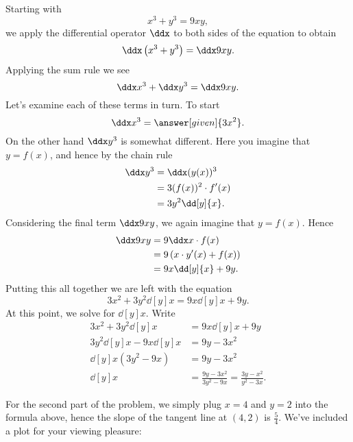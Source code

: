 \documentclass{ximera}
\begin{document}
\begin{example}
\begin{explanation}
Starting with 
\[
x^3+y^3 = 9xy,
\]
we apply the differential operator $\ddx$ to both sides of the
equation to obtain
\[
\ddx \left(x^3+y^3\right) = \ddx 9xy.
\]
Applying the sum rule we see
\[
\ddx x^3+\ddx y^3 = \ddx 9xy.
\]
Let's examine each of these terms in turn. To start
\[
\ddx x^3 = \answer[given]{3x^2}.
\]
On the other hand $\ddx y^3$ is somewhat different. Here you imagine that $y = f(x)$, and hence by the chain rule
\begin{align*}
\ddx y^3 &= \ddx (y(x))^3 \\ 
&= 3(f(x))^2 \cdot f'(x) \\
&= 3y^2\dd[y]{x}.
\end{align*}
Considering the final term $\ddx 9xy$, we again imagine that $y=f(x)$. Hence 
\begin{align*}
\ddx 9xy &= 9\ddx x\cdot f(x) \\
&= 9 \left(x\cdot y'(x) + f(x)\right)\\
&= 9x \dd[y]{x} + 9y.
\end{align*}
Putting this all together we are left with the equation
\[
3x^2 + 3y^2\dd[y]{x} =9x \dd[y]{x} + 9y.
\]
At this point, we solve for $\dd[y]{x}$. Write
\begin{align*}
3x^2 + 3y^2\dd[y]{x} &= 9x \dd[y]{x} + 9y\\
3y^2\dd[y]{x} -  9x \dd[y]{x} &= 9y - 3x^2\\
\dd[y]{x}\left(3y^2-9x\right)&= 9y - 3x^2\\
\dd[y]{x} &=\frac{9y - 3x^2}{3y^2-9x} = \frac{3y - x^2}{y^2-3x}.
\end{align*}

For the second part of the problem, we simply plug $x=4$ and $y=2$
into the formula above, hence the slope of the tangent line at $(4,2)$
is $\frac{5}{4}$. We've included a plot for your viewing pleasure:
\begin{image}
\end{image}
\end{explanation}
\end{example}
\end{document}
